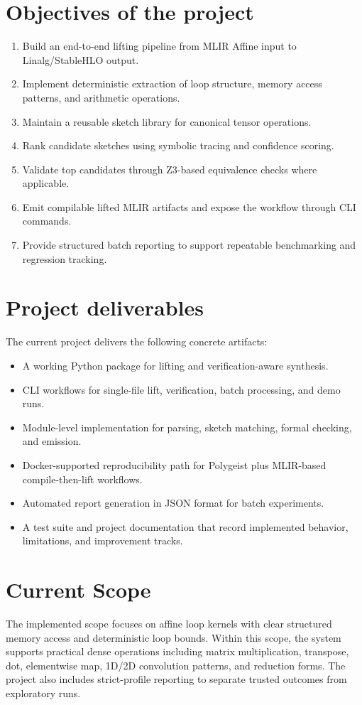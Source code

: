 \section{ Objectives of the project}
\begin{enumerate}
\item Build an end-to-end lifting pipeline from MLIR Affine input to Linalg/StableHLO output.
\item Implement deterministic extraction of loop structure, memory access patterns, and arithmetic operations.
\item Maintain a reusable sketch library for canonical tensor operations.
\item Rank candidate sketches using symbolic tracing and confidence scoring.
\item Validate top candidates through Z3-based equivalence checks where applicable.
\item Emit compilable lifted MLIR artifacts and expose the workflow through CLI commands.
\item Provide structured batch reporting to support repeatable benchmarking and regression tracking.
\end{enumerate}

\section{Project deliverables}
The current project delivers the following concrete artifacts:
\begin{itemize}
\item A working Python package for lifting and verification-aware synthesis.
\item CLI workflows for single-file lift, verification, batch processing, and demo runs.
\item Module-level implementation for parsing, sketch matching, formal checking, and emission.
\item Docker-supported reproducibility path for Polygeist plus MLIR-based compile-then-lift workflows.
\item Automated report generation in JSON format for batch experiments.
\item A test suite and project documentation that record implemented behavior, limitations, and improvement tracks.
\end{itemize}

\section{Current Scope}
The implemented scope focuses on affine loop kernels with clear structured memory access and deterministic loop bounds. Within this scope, the system supports practical dense operations including matrix multiplication, transpose, dot, elementwise map, 1D/2D convolution patterns, and reduction forms. The project also includes strict-profile reporting to separate trusted outcomes from exploratory runs.


